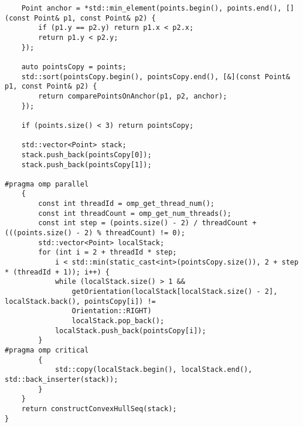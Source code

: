 \documentclass[14pt, a4paper]{extarticle}
\begin{document}
\begin{lstlisting}
    Point anchor = *std::min_element(points.begin(), points.end(), [](const Point& p1, const Point& p2) {
        if (p1.y == p2.y) return p1.x < p2.x;
        return p1.y < p2.y;
    });

    auto pointsCopy = points;
    std::sort(pointsCopy.begin(), pointsCopy.end(), [&](const Point& p1, const Point& p2) {
        return comparePointsOnAnchor(p1, p2, anchor);
    });

    if (points.size() < 3) return pointsCopy;

    std::vector<Point> stack;
    stack.push_back(pointsCopy[0]);
    stack.push_back(pointsCopy[1]);

#pragma omp parallel
    {
        const int threadId = omp_get_thread_num();
        const int threadCount = omp_get_num_threads();
        const int step = (points.size() - 2) / threadCount + (((points.size() - 2) % threadCount) != 0);
        std::vector<Point> localStack;
        for (int i = 2 + threadId * step;
            i < std::min(static_cast<int>(pointsCopy.size()), 2 + step * (threadId + 1)); i++) {
            while (localStack.size() > 1 &&
                getOrientation(localStack[localStack.size() - 2], localStack.back(), pointsCopy[i]) !=
                Orientation::RIGHT)
                localStack.pop_back();
            localStack.push_back(pointsCopy[i]);
        }
#pragma omp critical
        {
            std::copy(localStack.begin(), localStack.end(), std::back_inserter(stack));
        }
    }
    return constructConvexHullSeq(stack);
}
  \end{lstlisting}
  \newpage
\end{document}

